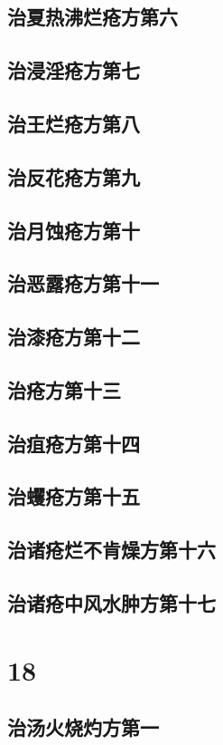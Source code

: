 \documentclass[a4paper,12pt,UTF8,twoside]{ctexbook}
\begin{document}
\chapter{治夏热沸烂疮方第六}
\chapter{治浸淫疮方第七}
\chapter{治王烂疮方第八}
\chapter{治反花疮方第九}
\chapter{治月蚀疮方第十}
\chapter{治恶露疮方第十一}
\chapter{治漆疮方第十二}
\chapter{治疮方第十三}
\chapter{治疽疮方第十四}
\chapter{治蠼疮方第十五}
\chapter{治诸疮烂不肯燥方第十六}
\chapter{治诸疮中风水肿方第十七}

\part{18}
\chapter{治汤火烧灼方第一}
\end{document}

